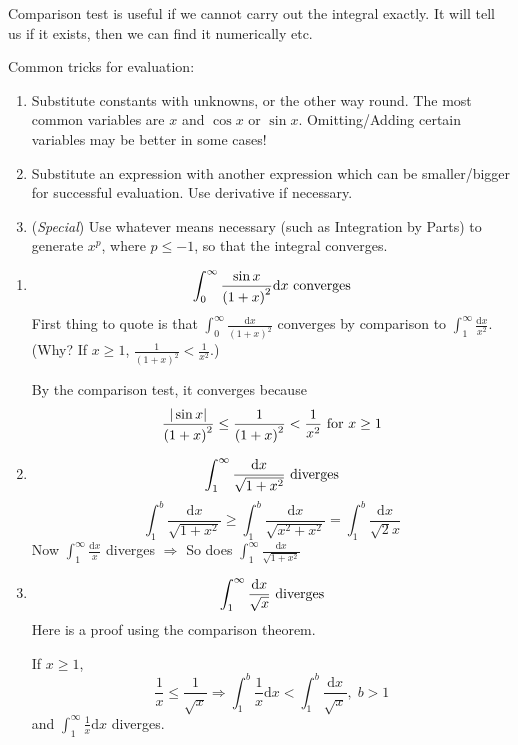 \documentclass[12pt]{report}
\theoremstyle{definition}
\begin{document}
Comparison test is useful if we cannot carry out the integral exactly. It will tell us if it exists, 
then we can find it numerically etc.

\begin{flushleft}
Common tricks for evaluation:
\begin{enumerate}
    \item Substitute constants with unknowns, or the other way round. 
        The most common variables are $x$ and $\cos{x}$ or $\sin{x}$. 
        Omitting/Adding certain variables may be better in some cases!
    \item Substitute an expression with another expression which can be smaller/bigger for successful evaluation.
        Use derivative if necessary.
    \item (\textit{Special}) Use whatever means necessary (such as Integration by Parts) to generate $x^{p}$, 
        where $p \le -1$, so that the integral converges.
\end{enumerate}
\end{flushleft}

\begin{ex}
    \;

    \begin{enumerate}[label = (\arabic*)]
        \item \[
                \int_0^{\infty} \frac{\sin{x}}{{(1+x)}^2} \mathrm{d}x \textnormal{ converges}
        \]
        First thing to quote is that $\int_0^{\infty} \frac{\mathrm{d}x}{{(1+x)}^{2}}$ converges by comparison to
        $\int_1^{\infty} \frac{\mathrm{d}x}{x^{2}}$. (Why? If $x \ge 1$, $\frac{1}{{(1+x)}^{2}} < \frac{1}{x^{2}}$.)

        By the comparison test, it converges because \[
        \frac{|\sin{x}|}{{(1+x)}^{2}} \le \frac{1}{{(1+x)}^{2}} < \frac{1}{x^{2}} \textnormal{ for } x \ge 1
        \]
        \item \[
                \int_1^{\infty} \frac{\mathrm{d}x}{\sqrt{1+x^{2}}} \textnormal{ diverges}
        \]\[
        \int_1^{b} \frac{\mathrm{d}x}{\sqrt{1+x^{2}}} \ge \int_1^{b} \frac{\mathrm{d}x}{\sqrt{x^2 + x^{2}}}
                = \int_1^{b} \frac{\mathrm{d}x}{\sqrt{2}x}
        \]
        Now $\int_1^{\infty} \frac{\mathrm{d}x}{x}$ diverges 
        $\Rightarrow$ So does $\int_1^{\infty} \frac{\mathrm{d}x}{\sqrt{1+x^{2}}}$

        \item \[
                \int_1^{\infty} \frac{\mathrm{d}x}{\sqrt{x}} \textnormal{ diverges}
        \]
        Here is a proof using the comparison theorem.

        If $x \ge 1$, \[
            \frac{1}{x} \le \frac{1}{\sqrt{x}} 
            \Rightarrow \int_1^{b} \frac{1}{x} \mathrm{d}x < \int_1^{b} \frac{\mathrm{d}x}{\sqrt{x}}, \;b > 1
        \] and $\int_1^{\infty} \frac{1}{x} \mathrm{d}x$ diverges.
    \end{enumerate}
    
\end{ex}
\end{document}
